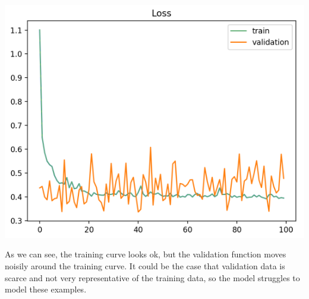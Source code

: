 \documentclass[letterpaper, 10.5pt,landscape]{article}
\begin{document}
\begin{multicols*}{3}
\begin{center}
    \begin{minipage}{0.5\linewidth}
        \includegraphics[width=\textwidth]{figures/First_scenario_Unrepresentative_Validation_Dataset.PNG}
    \end{minipage} 
\end{center}
\vspace{-3mm}

As we can see, the training curve looks ok, but the validation function moves noisily around the training curve.
It could be the case that validation data is scarce and not very representative of the training data, so the model struggles to model these examples.


\end{multicols*}
\end{document}
